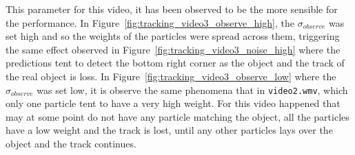 \documentclass{ethz_report}
\begin{document}
This parameter for this video, it has been observed to be the more sensible for the performance.
In Figure~\ref{fig:tracking_video3_observe_high}, the $\sigma_{observe}$ was set high and so the weights of the particles were spread across them, triggering the same effect observed in Figure~\ref{fig:tracking_video3_noise_high} where the predictions tent to detect the bottom right corner as the object and the track of the real object is loss.
In Figure~\ref{fig:tracking_video3_observe_low} where the $\sigma_{observe}$ was set low, it is observe the same phenomena that in \texttt{video2.wmv}, which only one particle tent to have a very high weight. For this video happened that may at some point do not have any particle matching the object, all the particles have a low weight and the track is lost, until any other particles lays over the object and the track continues.
\end{document}
